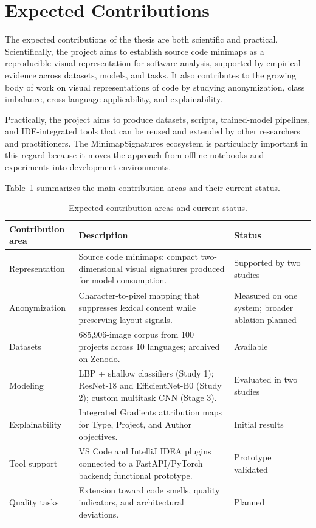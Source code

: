 \section{Expected Contributions}

The expected contributions of the thesis are both scientific and practical.
Scientifically, the project aims to establish source code minimaps as a
reproducible visual representation for software analysis, supported by empirical
evidence across datasets, models, and tasks. It also contributes to the growing
body of work on visual representations of code by studying anonymization,
class imbalance, cross-language applicability, and explainability.

Practically, the project aims to produce datasets, scripts, trained-model
pipelines, and IDE-integrated tools that can be reused and extended by other
researchers and practitioners. The MinimapSignatures ecosystem is particularly
important in this regard because it moves the approach from offline notebooks
and experiments into development environments.

Table~\ref{tab:intro-contributions} summarizes the main contribution areas and
their current status.

\begin{table}[ht]
\centering
\caption{Expected contribution areas and current status.}
\label{tab:intro-contributions}
\begin{tabular}{p{}p{}p{}}
\toprule
\textbf{Contribution area} & \textbf{Description} & \textbf{Status} \\
\midrule
Representation & Source code minimaps: compact two-dimensional visual signatures produced for model consumption. & Supported by two studies \\
Anonymization & Character-to-pixel mapping that suppresses lexical content while preserving layout signals. & Measured on one system; broader ablation planned \\
Datasets & 685,906-image corpus from 100 projects across 10 languages; archived on Zenodo. & Available \\
Modeling & LBP + shallow classifiers (Study 1); ResNet-18 and EfficientNet-B0 (Study 2); custom multitask CNN (Stage 3). & Evaluated in two studies \\
Explainability & Integrated Gradients attribution maps for Type, Project, and Author objectives. & Initial results \\
Tool support & VS Code and IntelliJ IDEA plugins connected to a FastAPI/PyTorch backend; functional prototype. & Prototype validated \\
Quality tasks & Extension toward code smells, quality indicators, and architectural deviations. & Planned \\
\bottomrule
\end{tabular}
\fautor
\end{table}

